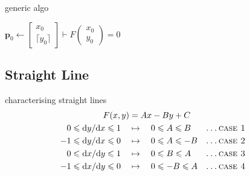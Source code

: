 \documentclass[aspectratio=169,xcolor={dvipsnames,svgnames}]{beamer}
\begin{document}
\begin{frame}[label={sec:org40b3ecc}]{generic algo}
\begin{algorithm}[H]
  \caption{Generic Mid-point Algorithm}
  \DontPrintSemicolon



  {$\mathbf{p}_0 \gets \begin{bmatrix} x_0 \\ \lceil
    y_0\rceil \end{bmatrix} \vdash F\left(\begin{matrix}
      x_0 \\ y_0 \end{matrix}\right) = 0$}


\end{algorithm}
\end{frame}


\subsection{Straight Line}
\label{sec:orgc8fc694}

\begin{frame}[label={sec:org997e59d}]{characterising straight lines}
\begin{align*}
  F(x,y)
  &= Ax-By+C \\
  0 \leqslant \mathrm{d}y / \mathrm{d}x \leqslant 1 \quad
  &\mapsto \quad 0 \leqslant A \leqslant B
  &&\textsc{\ldots case 1} \\
  -1 \leqslant \mathrm{d}y / \mathrm{d}x \leqslant 0 \quad
  &\mapsto \quad 0 \leqslant A \leqslant -B
  &&\textsc{\ldots case 2} \\
  0 \leqslant \mathrm{d}x / \mathrm{d}y \leqslant 1 \quad
  &\mapsto \quad 0 \leqslant B \leqslant A
  &&\textsc{\ldots case 3} \\
  -1 \leqslant \mathrm{d}x / \mathrm{d}y \leqslant 0 \quad
  &\mapsto \quad 0 \leqslant -B \leqslant A
  &&\textsc{\ldots case 4}
\end{align*}
\end{frame}
\end{document}
